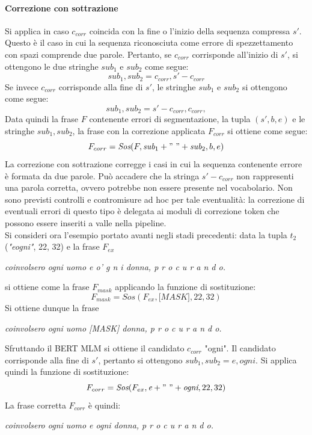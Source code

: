 \paragraph{Correzione con sottrazione}
Si applica in caso $c_{corr}$ coincida con la fine o l'inizio della sequenza compressa $s\prime$. Questo è il caso in cui la sequenza riconosciuta come errore di spezzettamento con spazi comprende due parole. Pertanto, se $c_{corr}$ corrisponde all'inizio di $s\prime$, si ottengono le due stringhe $\textit{sub}_1$ e $\textit{sub}_2$ come segue:
\begin{equation}
\textit{sub}_1,\textit{sub}_2 = c_{corr}, s\prime -c_{corr}
\end{equation}
Se invece $c_{corr}$ corrisponde alla fine di $s\prime$, le stringhe $\textit{sub}_1$ e $\textit{sub}_2$ si ottengono  come segue:
\begin{equation}
\textit{sub}_1,\textit{sub}_2 = s\prime -c_{corr},c_{corr},
\end{equation}
Data quindi la frase $F$ contenente errori di segmentazione, la tupla $(s\prime,b,e)$ e le stringhe $\textit{sub}_1,\textit{sub}_2$, la frase con la correzione applicata $F_{corr}$ si ottiene come segue:
\begin{equation}
F_{corr} = \textit{Sos}(F, \textit{sub}_1 + "\ " + \textit{sub}_2  ,b,e)
\end{equation}
La correzione con sottrazione corregge i casi in cui la sequenza contenente errore è formata da due parole. Può accadere che la stringa $s\prime -c_{corr}$ non rappresenti una parola corretta, ovvero potrebbe non essere presente nel vocabolario. Non sono previsti controlli e contromisure ad hoc per tale eventualità: la correzione di eventuali errori di questo tipo è delegata ai moduli di correzione token che possono essere inseriti a valle nella pipeline.\\
Si consideri ora l'esempio portato avanti negli stadi precedenti: data la tupla $t_2$ (\textit{"eogni"}, 22, 32) e la frase $F_{ex}$
\begin{center}
\textit{coinvolsero ogni uomo e o' g n i donna, p r o c u r a n d o.}
\end{center}
si ottiene come la frase $F_{mask}$ applicando la funzione di sostituzione:
\begin{equation}
F_{mask} = \textit{Sos}(F_{ex},\textit{[MASK]},22,32)
\end{equation}
Si ottiene dunque la frase
\begin{center}
\textit{coinvolsero ogni uomo [MASK] donna, p r o c u r a n d o.}
\end{center}
Sfruttando il BERT MLM si ottiene il candidato $c_{corr}$ "ogni". Il candidato corrisponde alla fine di $s\prime$, pertanto si ottengono $\textit{sub}_1,\textit{sub}_2 = \textit{e}, \textit{ogni}$. Si applica quindi la funzione di sostituzione:
\begin{equation}
F_{corr} = \textit{Sos}(F_{ex}, \textit{e} + "\ " + \textit{ogni} ,22,32)
\end{equation}
La frase corretta $F_{corr}$ è quindi: 
\begin{center}
\textit{coinvolsero ogni uomo e ogni donna, p r o c u r a n d o.}
\end{center}

